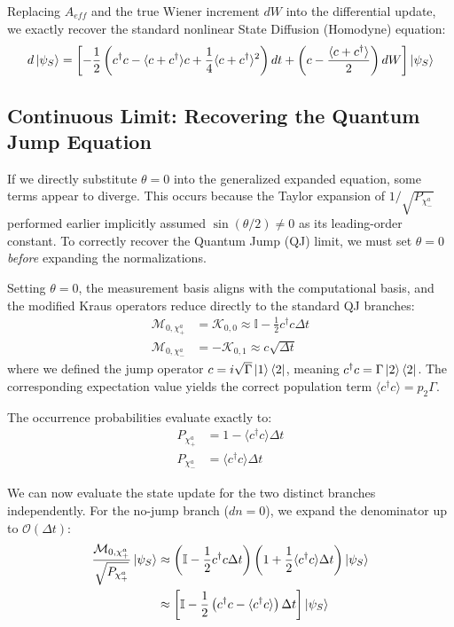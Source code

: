 \documentclass[a4paper,12pt]{article}
\begin{document}
Replacing $ A_{eff} $ and the true Wiener increment $ dW $ into the differential update, we exactly recover the standard nonlinear State Diffusion (Homodyne) equation:
\begin{equation}
	d\ket{\psi_{S}} = \left[ -\frac{1}{2}\left(c^\dagger c - \langle c + c^\dagger \rangle c + \frac{1}{4}\langle c + c^\dagger \rangle^2 \right)dt + \left(c - \frac{\langle c + c^\dagger \rangle}{2}\right)dW \right] \ket{\psi_{S}}
\end{equation}

\subsection{Continuous Limit: Recovering the Quantum Jump Equation}

If we directly substitute $ \theta = 0 $ into the generalized expanded equation, some terms appear to diverge. This occurs because the Taylor expansion of $ 1/\sqrt{P_{\chi_{-}^{a}}} $ performed earlier implicitly assumed $ \sin(\theta/2) \neq 0 $ as its leading-order constant. To correctly recover the Quantum Jump (QJ) limit, we must set $ \theta = 0 $ \emph{before} expanding the normalizations.

Setting $ \theta = 0 $, the measurement basis aligns with the computational basis, and the modified Kraus operators reduce directly to the standard QJ branches:
\begin{align}
	\mathcal{M}_{0, \chi_{+}^{a}} &= \mathcal{K}_{0,0} \approx \mathbb{I} - \frac{1}{2} c^\dagger c \Delta t \\
	\mathcal{M}_{0, \chi_{-}^{a}} &= -\mathcal{K}_{0,1} \approx c \sqrt{\Delta t}
\end{align}
where we defined the jump operator $ c = i\sqrt{\Gamma}\ket{1}\bra{2} $, meaning $ c^\dagger c = \Gamma\ket{2}\bra{2} $. The corresponding expectation value yields the correct population term $ \langle c^\dagger c \rangle = p_2 \Gamma $.

The occurrence probabilities evaluate exactly to:
\begin{align}
	P_{\chi_{+}^{a}} &= 1 - \langle c^\dagger c \rangle \Delta t \\
	P_{\chi_{-}^{a}} &= \langle c^\dagger c \rangle \Delta t
\end{align}

We can now evaluate the state update for the two distinct branches independently.
For the no-jump branch ($ dn = 0 $), we expand the denominator up to $ \mathcal{O}(\Delta t) $:
\begin{align}
	\frac{\mathcal{M}_{0, \chi_{+}^{a}}}{\sqrt{P_{\chi_{+}^{a}}}} \ket{\psi_{S}} &\approx \left( \mathbb{I} - \frac{1}{2} c^\dagger c \Delta t \right) \left( 1 + \frac{1}{2} \langle c^\dagger c \rangle \Delta t \right) \ket{\psi_{S}} \notag \\
	&\approx \left[ \mathbb{I} - \frac{1}{2} \left( c^\dagger c - \langle c^\dagger c \rangle \right) \Delta t \right] \ket{\psi_{S}}
\end{align}
\end{document}

